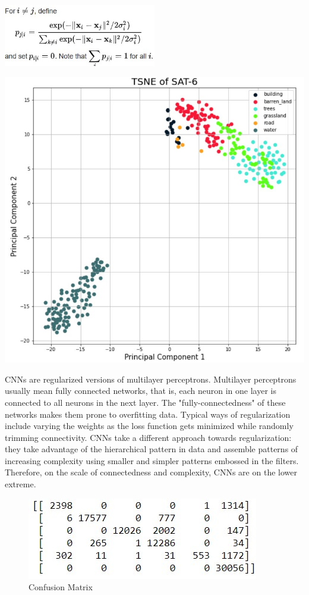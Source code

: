 \documentclass[12pt, letterpaper]{article}
\begin{document}
\begin{center}
             \includegraphics[width=0.5\textwidth]{figures/tsne.jpg}
\end{center}

\newpage
\begin{center}
             \includegraphics{figures/tsnegraph.jpg}
\end{center}
\newpage
\hspace*{0.25 in}CNNs are regularized versions of multilayer perceptrons. Multilayer perceptrons usually mean fully connected networks, that is, each neuron in one layer is connected to all neurons in the next layer. The "fully-connectedness" of these networks makes them prone to overfitting data. Typical ways of regularization include varying the weights as the loss function gets minimized while randomly trimming connectivity. CNNs take a different approach towards regularization: they take advantage of the hierarchical pattern in data and assemble patterns of increasing complexity using smaller and simpler patterns embossed in the filters. Therefore, on the scale of connectedness and complexity, CNNs are on the lower extreme.
\begin{figure}[!h]
    \centering
    \includegraphics{figures/confuse.jpg}
    \caption{Confusion Matrix}
    \label{Confusion Matrix}
\end{figure}
\end{document}
